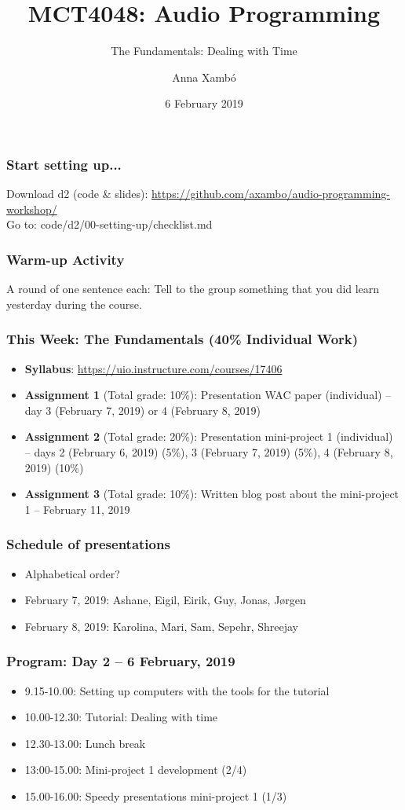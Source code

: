 \documentclass[screen, aspectratio=43]{beamer}
\title[AP-intro]{MCT4048: Audio Programming}
\subtitle{The Fundamentals: Dealing with Time}
\author[A. Xamb{\'o}]{Anna Xamb{\'o}}
\institute[NTNU]{Department of Music, NTNU}
\date{6 February 2019}
\begin{document}
\begin{frame}
  \titlepage
\end{frame}


%
\begin{frame}
\frametitle{Start setting up...}
Download d2 (code \& slides): \url{https://github.com/axambo/audio-programming-workshop/} 
\\
\vspace{10 mm}
Go to: \textrm{code/d2/00-setting-up/checklist.md}
\end{frame}
%
\begin{frame}
\frametitle{Warm-up Activity}
A round of one sentence each: Tell to the group something that you did  learn yesterday during the course.
\end{frame}
%
\begin{frame}
\frametitle{This Week: The Fundamentals (40\% Individual Work)}
\begin{itemize}
\item \textbf{Syllabus}: \url{https://uio.instructure.com/courses/17406}
\item \textbf{Assignment 1} (Total grade: 10\%): Presentation WAC paper (individual) -- day 3 (February 7, 2019) or 4 (February 8, 2019)
\item \textbf{Assignment 2} (Total grade: 20\%): Presentation mini-project 1 (individual) -- days 2 (February 6, 2019) (5\%), 3 (February 7, 2019) (5\%), 4 (February 8, 2019) (10\%)
\item \textbf{Assignment 3} (Total grade: 10\%): Written blog post about the mini-project 1 -- February 11, 2019
\end{itemize}
\end{frame}
%
\begin{frame}
\frametitle{Schedule of presentations}
\begin{itemize}
\item Alphabetical order?
\item February 7, 2019: Ashane, Eigil, Eirik, Guy, Jonas, Jørgen
\item February 8, 2019: Karolina, Mari, Sam, Sepehr, Shreejay
\end{itemize}
\end{frame}
%
\begin{frame}
\frametitle{Program: Day 2 -- 6 February, 2019}
\begin{itemize}
\item 9.15-10.00: Setting up computers with the tools for the tutorial
\item 10.00-12.30: Tutorial: Dealing with time
\item 12.30-13.00: Lunch break
\item 13:00-15.00: Mini-project 1 development (2/4)
\item 15.00-16.00: Speedy presentations mini-project 1 (1/3)
\end{itemize}
\end{frame}
\end{document}

